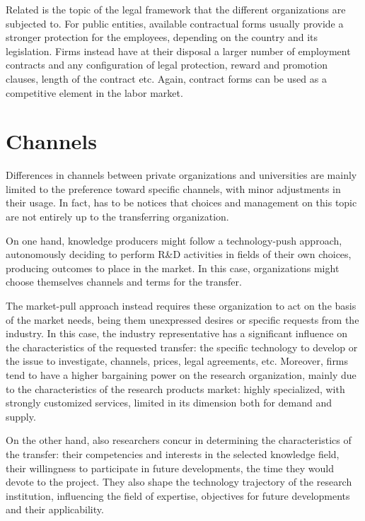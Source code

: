Related is the topic of the legal framework that the different organizations are subjected to. For public entities, available contractual forms usually provide a stronger protection for the employees, depending on the country and its legislation. Firms instead have at their disposal a larger number of employment contracts and any configuration of legal protection, reward and promotion clauses, length of the contract etc. Again, contract forms can be used as a competitive element in the labor market. 

\section{Channels}

Differences in channels between private organizations and universities are mainly limited to the preference toward specific channels, with minor adjustments in their usage. In fact, has to be notices that choices and management on this topic are not entirely up to the transferring organization. 

On one hand, knowledge producers might follow a technology-push approach, autonomously deciding to perform R\&D activities in fields of their own choices, producing outcomes to place in the market. In this case, organizations might choose themselves channels and terms for the transfer.

The market-pull approach instead requires these organization to act on the basis of the market needs, being them unexpressed desires or specific requests from the industry. In this case, the industry representative has a significant influence on the characteristics of the requested transfer: the specific technology to develop or the issue to investigate, channels, prices, legal agreements, etc. Moreover, firms tend to have a higher bargaining power on the research organization, mainly due to the characteristics of the research products market: highly specialized, with strongly customized services, limited in its dimension both for demand and supply.

On the other hand, also researchers concur in determining the characteristics of the transfer: their competencies and interests in the selected knowledge field, their willingness to participate in future developments, the time they would devote to the project. They also shape the technology trajectory of the research institution, influencing the field of expertise, objectives for future developments and their applicability.

